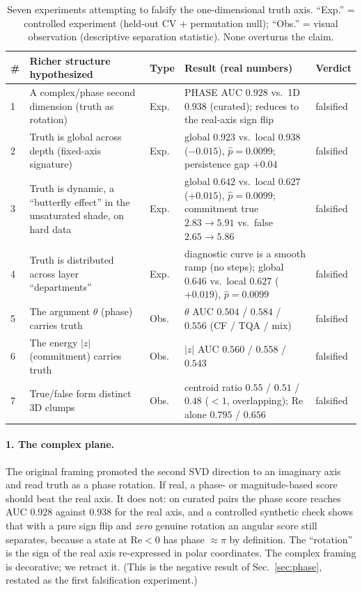 \documentclass[11pt]{article}
\begin{document}
\begin{table}[t]
\centering
\caption{Seven experiments attempting to falsify the one-dimensional truth
axis. ``Exp.'' = controlled experiment (held-out CV + permutation null);
``Obs.'' = visual observation (descriptive separation statistic). None
overturns the claim.}
\label{tab:seven}
\small
\begin{tabular}{p{0.5cm}p{4.6cm}p{1.1cm}p{4.6cm}p{1.4cm}}
\toprule
\# & Richer structure hypothesized & Type & Result (real numbers) & Verdict \\
\midrule
1 & A complex/phase second dimension (truth as rotation) & Exp. & PHASE AUC $0.928$ vs.\ 1D $0.938$ (curated); reduces to the real-axis sign flip & falsified \\
2 & Truth is global across depth (fixed-axis signature) & Exp. & global $0.923$ vs.\ local $0.938$ ($-0.015$), $\hat{p} = 0.0099$; persistence gap $+0.04$ & falsified \\
3 & Truth is dynamic, a ``butterfly effect'' in the unsaturated shade, on hard data & Exp. & global $0.642$ vs.\ local $0.627$ ($+0.015$), $\hat{p} = 0.0099$; commitment true $2.83 \to 5.91$ vs.\ false $2.65 \to 5.86$ & falsified \\
4 & Truth is distributed across layer ``departments'' & Exp. & diagnostic curve is a smooth ramp (no steps); global $0.646$ vs.\ local $0.627$ ($+0.019$), $\hat{p} = 0.0099$ & falsified \\
5 & The argument $\theta$ (phase) carries truth & Obs. & $\theta$ AUC $0.504$ / $0.584$ / $0.556$ (CF / TQA / mix) & falsified \\
6 & The energy $|z|$ (commitment) carries truth & Obs. & $|z|$ AUC $0.560$ / $0.558$ / $0.543$ & falsified \\
7 & True/false form distinct 3D clumps & Obs. & centroid ratio $0.55$ / $0.51$ / $0.48$ ($<1$, overlapping); $\mathrm{Re}$ alone $0.795$ / $0.656$ & falsified \\
\bottomrule
\end{tabular}
\end{table}

\paragraph{1. The complex plane.} The original framing promoted the second
SVD direction to an imaginary axis and read truth as a phase rotation. If
real, a phase- or magnitude-based score should beat the real axis. It does
not: on curated pairs the phase score reaches AUC $0.928$ against $0.938$ for
the real axis, and a controlled synthetic check shows that with a pure sign
flip and \emph{zero} genuine rotation an angular score still separates,
because a state at $\mathrm{Re} < 0$ has phase $\approx \pi$ by definition.
The ``rotation'' is the sign of the real axis re-expressed in polar
coordinates. The complex framing is decorative; we retract it. (This is the
negative result of Sec.~\ref{sec:phase}, restated as the first falsification
experiment.)
\end{document}
